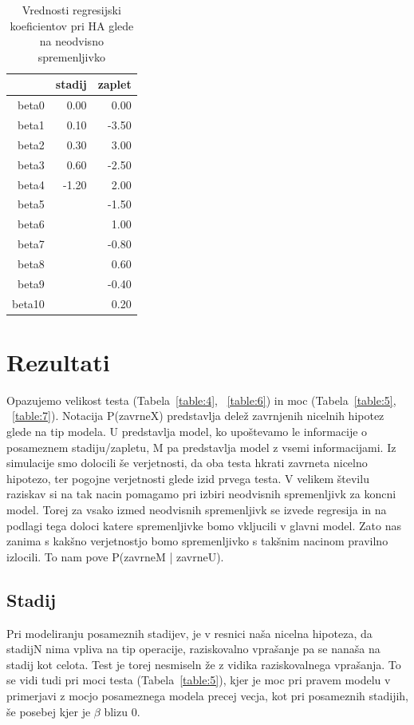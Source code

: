 \documentclass[letterpaper,11pt]{article}
\begin{document}
\begin{table}[ht]
\centering
\begin{tabular}{rrr}
  \hline
 & stadij & zaplet \\ 
  \hline
beta0 & 0.00 & 0.00 \\ 
  beta1 & 0.10 & -3.50 \\ 
  beta2 & 0.30 & 3.00 \\ 
  beta3 & 0.60 & -2.50 \\ 
  beta4 & -1.20 & 2.00 \\ 
  beta5 &  & -1.50 \\ 
  beta6 &  & 1.00 \\ 
  beta7 &  & -0.80 \\ 
  beta8 &  & 0.60 \\ 
  beta9 &  & -0.40 \\ 
  beta10 &  & 0.20 \\ 
   \hline
\end{tabular}
\caption{Vrednosti regresijski koeficientov pri HA glede na neodvisno spremenljivko} 
\label{table:3}
\end{table}
\newpage
\section{Rezultati}
Opazujemo velikost testa (Tabela~\ref{table:4}, ~\ref{table:6}) in moc (Tabela~\ref{table:5}, ~\ref{table:7}). Notacija P(zavrneX) predstavlja delež zavrnjenih nicelnih hipotez glede na tip modela. U predstavlja model, ko upoštevamo le informacije o posameznem stadiju/zapletu, M pa predstavlja model z vsemi informacijami. Iz simulacije smo dolocili še verjetnosti, da oba testa hkrati zavrneta nicelno hipotezo, ter pogojne verjetnosti glede izid prvega testa. V velikem številu raziskav si na tak nacin pomagamo pri izbiri neodvisnih spremenljivk za koncni model. Torej za vsako izmed neodvisnih spremenljivk se izvede regresija in na podlagi tega doloci katere spremenljivke bomo vkljucili v glavni model. Zato nas zanima s kakšno verjetnostjo bomo spremenljivko s takšnim nacinom pravilno izlocili. To nam pove P(zavrneM | zavrneU). 
\subsection{Stadij}
Pri modeliranju posameznih stadijev, je v resnici naša nicelna hipoteza, da stadijN nima vpliva na tip operacije, raziskovalno vprašanje pa se nanaša na stadij kot celota. Test je torej nesmiseln že z vidika raziskovalnega vprašanja. To se vidi tudi pri moci testa (Tabela~\ref{table:5}), kjer je moc pri pravem modelu v primerjavi z mocjo posameznega modela precej vecja, kot pri posameznih stadijih, še posebej kjer je $\beta$ blizu 0.
\end{document}
